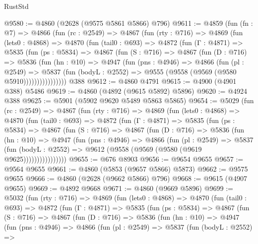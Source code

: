 \begin{lexlean}{RustStd}
\begin{coremodule}
@9580 := @4860 (@2628 (@9575 @5861 @5866) @796)
@9611 := @4859
    (fun (fn : @7) =>
    @4866
      (fun (rc : @2549) =>
      @4867
        (fun (rty : @716) =>
        @4869
          (fun (lets0 : @4868) =>
          @4870
            (fun (tail0 : @693) =>
            @4872
              (fun (Γ : @4871) =>
              @5835
                (fun (ps : @5834) =>
                @4867
                  (fun (S : @716) =>
                  @4867
                    (fun (D : @716) =>
                    @5836
                      (fun (hn : @10) =>
                      @4947
                        (fun (pns : @4946) =>
                        @4866
                          (fun (pl : @2549) =>
                          @5837
                            (fun (bodyL : @2552) => @9555 (@9558 (@9569 (@9580 @5910))))))))))))))))
    @388
@9612 := @4860 @4791
@9615 := @4900 (@4901 @388) @5486
@9619 := @4860 (@4892 (@9615 @5892) @5896)
@9620 := @4924 @388
@9625 := @5901 (@5902 @9620 @5489 @5863 @5865)
@9654 := @5029
    (fun (rc : @2549) =>
    @4867
      (fun (rty : @716) =>
      @4869
        (fun (lets0 : @4868) =>
        @4870
          (fun (tail0 : @693) =>
          @4872
            (fun (Γ : @4871) =>
            @5835
              (fun (ps : @5834) =>
              @4867
                (fun (S : @716) =>
                @4867
                  (fun (D : @716) =>
                  @5836
                    (fun (hn : @10) =>
                    @4947
                      (fun (pns : @4946) =>
                      @4866
                        (fun (pl : @2549) =>
                        @5837
                          (fun (bodyL : @2552) =>
                          @9612 (@9558 (@9569 (@9580 (@9619 @9625))))))))))))))))
@9655 := @676 @8903
@9656 := @9654 @9655
@9657 := @9564 @9655
@9661 := @4860 (@5853 (@9657 @5866) @5873)
@9662 := @9575 @9655
@9666 := @4860 (@2628 (@9662 @5866) @796)
@9668 := @9615 (@4907 @9655)
@9669 := @4892 @9668
@9671 := @4860 (@9669 @5896)
@9699 := @5032
    (fun (rty : @716) =>
    @4869
      (fun (lets0 : @4868) =>
      @4870
        (fun (tail0 : @693) =>
        @4872
          (fun (Γ : @4871) =>
          @5835
            (fun (ps : @5834) =>
            @4867
              (fun (S : @716) =>
              @4867
                (fun (D : @716) =>
                @5836
                  (fun (hn : @10) =>
                  @4947
                    (fun (pns : @4946) =>
                    @4866
                      (fun (pl : @2549) =>
                      @5837
                        (fun (bodyL : @2552) =>

\end{coremodule}
\end{lexlean}
